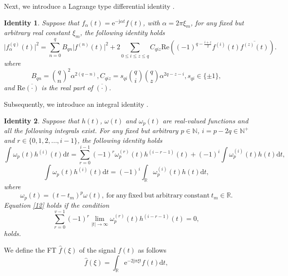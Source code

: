 \documentclass[preprint,12pt]{elsarticle}
\newtheorem{id}{Identity}
\begin{document}
Next, we introduce a Lagrange type differential identity \cite{HPW}.
\begin{id}
	Suppose that $f_{\alpha}(t) = \mathrm{e}^{-\mathrm{j} \alpha t}f(t)$, with $\alpha = 2 \pi \xi_m$, for any fixed but arbitrary real constant $\xi_m$, the following identity holds
	\begin{equation}
	\label{9}
	\lvert f_{\alpha}^{(q)}(t) \rvert^2 = \sum_{n=0}^q B_{qn} \lvert f^{(n)}(t) \rvert^2 +2 \sum_{0 \leq i \leq z \leq q} C_{qiz} \mathrm{Re}((-1)^{q-\frac{i+z}{2}}  f^{(i)}(t) \overline{f^{(z)}(t)}).
	\end{equation}
	where 
	\begin{equation}
	\label{90}
	B_{qn}= \binom{q}{n}^2 \alpha^{2(q-n)}, C_{qiz} = s_{qi} \binom{q}{i} \binom{q}{z} \alpha^{2q-z-i}, s_{qi} \in \{\pm1\},
	\end{equation}
	and $\mathrm{Re} \overline{(\cdot)}$ is the real part of $\overline{(\cdot)}$.
\end{id}
Subsequently, we introduce an integral identity  \cite{HPW}.
\begin{id}
	Suppose that $h(t)$, $\omega(t)$ and $\omega_p(t)$ are real-valued functions and all the following integrals exist. For any fixed but arbitrary $p \in \mathbb{N}$, $i =p-2q \in \mathbb{N}^+$ and $r \in \{0, 1, 2, . . ., i-1 \}$, the following identity holds
	\begin{equation}
	\label{11}
	\int \omega_p(t) h^{(i)} (t) \mathrm{d}t = \sum_{r=0}^{i-1} (-1)^r \omega_p^{(r)}(t) h^{(i-r-1)}(t)+(-1)^i \int \omega_p^{(i)}(t) h(t) \mathrm{d}t,
	\end{equation}
	\begin{equation}
	\label{12}
	\int \omega_p(t) h^{(i)} (t) \mathrm{d}t = (-1)^i \int_{\mathbb{R}} \omega_p^{(i)}(t) h(t) \mathrm{d}t,
	\end{equation}
	where 
	\begin{equation}
	\label{91}
	\omega_p(t) = (t-t_m)^p \omega(t), \  \mathrm{for \ any \ fixed \ but \ arbitrary \ constant} \ t_m \in \mathbb{R}.
	\end{equation}
	Equation \eqref{12} holds if the condition
	\begin{equation}
	\label{13}
	\sum_{r=0}^{v-1} (-1)^r \lim_{\lvert t \rvert \rightarrow \infty} \omega_p^{(r)} (t) h^{(i-r-1)}(t) = 0,
	\end{equation}
	holds.
\end{id}
We define the FT $\hat{f}(\xi)$ of the signal $f(t)$ as follows
\begin{equation}
\label{3}
\hat{f}(\xi) = \int_{\mathbb{R}} \mathrm{e}^{-2 \mathrm{j} \pi \xi t} f(t) \mathrm{d}t,
\end{equation}  
\end{document}
